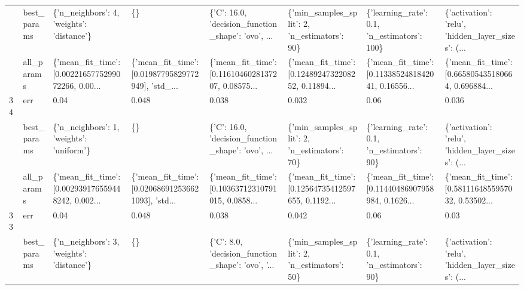 \begin{tabular}{llllllll}
   & best\_params &          \{'n\_neighbors': 4, 'weights': 'distance'\} &                                                 \{\} &  \{'C': 16.0, 'decision\_function\_shape': 'ovo', ... &       \{'min\_samples\_split': 2, 'n\_estimators': 90\} &        \{'learning\_rate': 0.1, 'n\_estimators': 100\} &  \{'activation': 'relu', 'hidden\_layer\_sizes': (... \\
   & all\_params &  \{'mean\_fit\_time': [0.0022165775299072266, 0.00... &  \{'mean\_fit\_time': [0.01987795829772949], 'std\_... &  \{'mean\_fit\_time': [0.1161046028137207, 0.08575... &  \{'mean\_fit\_time': [0.1248924732208252, 0.11894... &  \{'mean\_fit\_time': [0.1133852481842041, 0.16556... &  \{'mean\_fit\_time': [0.665805435180664, 0.696884... \\
34 & err &                                               0.04 &                                              0.048 &                                              0.038 &                                              0.032 &                                               0.06 &                                              0.036 \\
   & best\_params &           \{'n\_neighbors': 1, 'weights': 'uniform'\} &                                                 \{\} &  \{'C': 16.0, 'decision\_function\_shape': 'ovo', ... &       \{'min\_samples\_split': 2, 'n\_estimators': 70\} &         \{'learning\_rate': 0.1, 'n\_estimators': 90\} &  \{'activation': 'relu', 'hidden\_layer\_sizes': (... \\
   & all\_params &  \{'mean\_fit\_time': [0.002939176559448242, 0.002... &  \{'mean\_fit\_time': [0.020686912536621093], 'std... &  \{'mean\_fit\_time': [0.10363712310791015, 0.0858... &  \{'mean\_fit\_time': [0.12564735412597655, 0.1192... &  \{'mean\_fit\_time': [0.11440486907958984, 0.1626... &  \{'mean\_fit\_time': [0.5811164855957032, 0.53502... \\
33 & err &                                               0.04 &                                              0.048 &                                              0.038 &                                              0.042 &                                               0.06 &                                               0.03 \\
   & best\_params &          \{'n\_neighbors': 3, 'weights': 'distance'\} &                                                 \{\} &  \{'C': 8.0, 'decision\_function\_shape': 'ovo', '... &       \{'min\_samples\_split': 2, 'n\_estimators': 50\} &         \{'learning\_rate': 0.1, 'n\_estimators': 90\} &  \{'activation': 'relu', 'hidden\_layer\_sizes': (... \\

\end{tabular}

